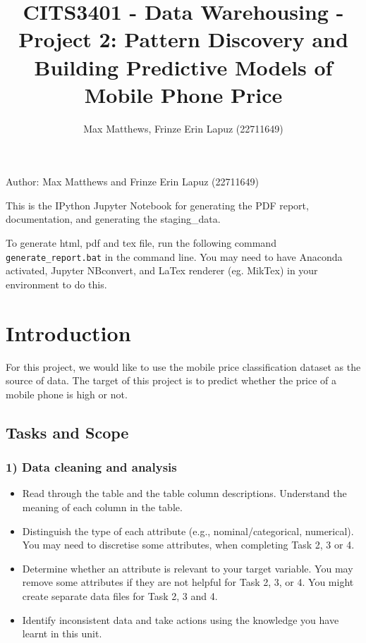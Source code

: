 \documentclass[11pt]{article}
\title{CITS3401 - Data Warehousing - Project 2: Pattern Discovery and Building Predictive Models of Mobile Phone Price}
\author{Max Matthews, Frinze Erin Lapuz (22711649)}
\providecommand{\tightlist}{%
      \setlength{\itemsep}{0pt}\setlength{\parskip}{0pt}}
\begin{document}
    
    \maketitle
    
    

    
    Author: Max Matthews and Frinze Erin Lapuz (22711649)

This is the IPython Jupyter Notebook for generating the PDF report,
documentation, and generating the staging\_data.

To generate html, pdf and tex file, run the following command
\texttt{generate\_report.bat} in the command line. You may need to have
Anaconda activated, Jupyter NBconvert, and LaTex renderer (eg. MikTex)
in your environment to do this.

    \hypertarget{introduction}{%
\section{Introduction}\label{introduction}}

For this project, we would like to use the mobile price classification
dataset as the source of data. The target of this project is to predict
whether the price of a mobile phone is high or not.

    \hypertarget{tasks-and-scope}{%
\subsection{Tasks and Scope}\label{tasks-and-scope}}

\hypertarget{data-cleaning-and-analysis}{%
\subsubsection{1) Data cleaning and
analysis}\label{data-cleaning-and-analysis}}

\begin{itemize}
\tightlist
\item
  Read through the table and the table column descriptions. Understand
  the meaning of each column in the table.
\item
  Distinguish the type of each attribute (e.g., nominal/categorical,
  numerical). You may need to discretise some attributes, when
  completing Task 2, 3 or 4.
\item
  Determine whether an attribute is relevant to your target variable.
  You may remove some attributes if they are not helpful for Task 2, 3,
  or 4. You might create separate data files for Task 2, 3 and 4.
\item
  Identify inconsistent data and take actions using the knowledge you
  have learnt in this unit.
\end{itemize}
\end{document}
